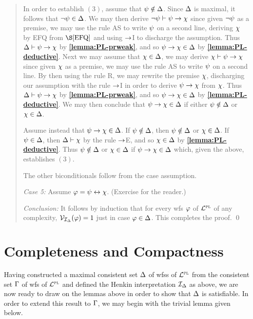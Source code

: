 \begin{quote}
  In order to establish $(3)$, assume that $\psi \notin \Delta$.
  Since $\Delta$ is maximal, it follows that $\neg \psi \in \Delta$.
  We may then derive $\neg \psi \vdash \psi \rightarrow \chi$ since given $\neg \psi$ as a premise, we may use the rule AS to write $\psi$ on a second line, deriving $\chi$ by EFQ from $\S\ref{EFQ}$ and using $\rightarrow$I to discharge the assumption.
  Thus $\Delta\vdash\psi\rightarrow\chi$ by \textbf{\ref{lemma:PL-prweak}}, and so $\psi\rightarrow\chi\in\Delta$ by \textbf{\ref{lemma:PL-deductive}}.
  Next we may assume that $\chi\in\Delta$, we may derive $\chi\vdash\psi\rightarrow\chi$ since given $\chi$ as a premise, we may use the rule AS to write $\psi$ on a second line.
  By then using the rule R, we may rewrite the premise $\chi$, discharging our assumption with the rule $\rightarrow$I in order to derive $\psi\rightarrow\chi$ from $\chi$. 
  Thus $\Delta\vdash\psi\rightarrow\chi$ by \textbf{\ref{lemma:PL-prweak}}, and so $\psi\rightarrow\chi\in\Delta$ by \textbf{\ref{lemma:PL-deductive}}.
  We may then conclude that $\psi\rightarrow\chi\in\Delta$ if either $\psi\notin\Delta$ or $\chi\in\Delta$.

  Assume instead that $\psi\rightarrow\chi\in\Delta$.
  If $\psi\notin\Delta$, then $\psi\notin\Delta$ or $\chi\in\Delta$.
  If $\psi\in\Delta$, then $\Delta\vdash\chi$ by the rule $\rightarrow$E, and so $\chi\in\Delta$ by \textbf{\ref{lemma:PL-deductive}}.
  Thus $\psi\notin\Delta$ or $\chi\in\Delta$ if $\psi\rightarrow\chi\in\Delta$ which, given the above, establishes $(3)$.  

  The other biconditionals follow from the case assumption.

  \textit{Case 5:}
  Assume $\varphi=\psi\leftrightarrow\chi$.
  (Exercise for the reader.)

  \textit{Conclusion:}
  It follows by induction that for every wfs $\varphi$ of $\mathcal{L}^{\textsc{pl}}$ of any complexity, $\mathcal{V}_{\mathcal{I}_{\Delta}}(\varphi) = 1$ just in case $\varphi\in\Delta$. 
  This completes the proof.
  \qed
\end{quote}





\section{Completeness and Compactness}%
  \label{sec:PL-CompleteCompact}

Having constructed a maximal consistent set $\Delta$ of wfss of $\mathcal{L}^{\textsc{pl}}$ from the consistent set $\Gamma$ of wfs of $\mathcal{L}^{\textsc{pl}}$ and defined the Henkin interpretation $\mathcal{I}_{\Delta}$ as above, we are now ready to draw on the lemmas above in order to show that $\Delta$ is satisfiable.
In order to extend this result to $\Gamma$, we may begin with the trivial lemma given below. 

